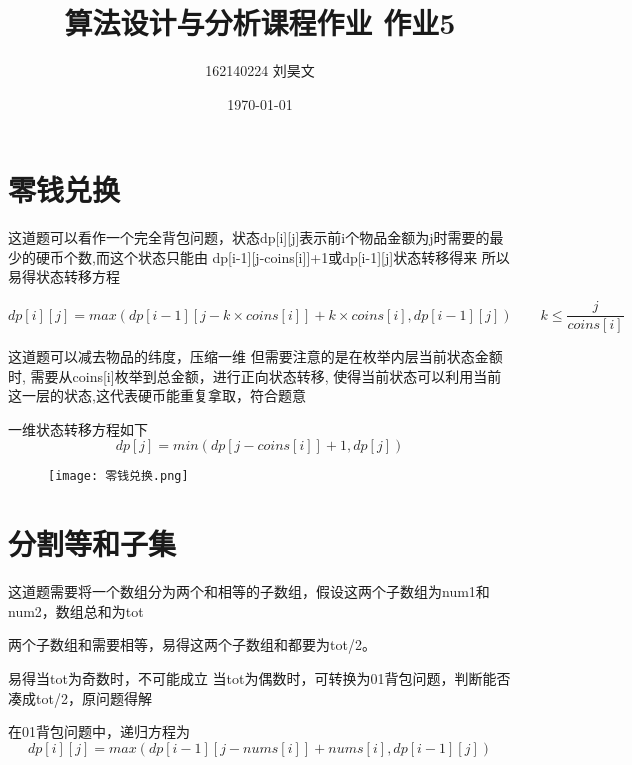 \documentclass{article}
\title{\textbf{算法设计与分析课程作业 作业5}}
\author{162140224 刘昊文}
\date{\today}
\begin{document}
\maketitle

\section{零钱兑换}
这道题可以看作一个完全背包问题，状态dp[i][j]表示前i个物品金额为j时需要的最少的硬币个数,而这个状态只能由
dp[i-1][j-coins[i]]+1或dp[i-1][j]状态转移得来
所以易得状态转移方程

\begin{equation}
    dp[i][j]=max(dp[i-1][j-k \times coins[i]]+k\times coins[i],dp[i-1][j])  \qquad k\leq \frac{j}{coins[i]}
    \nonumber
\end{equation}


这道题可以减去物品的纬度，压缩一维
但需要注意的是在枚举内层当前状态金额时,
需要从coins[i]枚举到总金额，进行正向状态转移,
使得当前状态可以利用当前这一层的状态,这代表硬币能重复拿取，符合题意

一维状态转移方程如下
\begin{equation}
    dp[j]=min(dp[j-coins[i]]+1,dp[j])
    \nonumber
\end{equation}


\begin{figure}[H]
    \begin{flushleft}
    \texttt{[image: 零钱兑换.png]}
    \end{flushleft}
\end{figure}


\newpage
\section{分割等和子集}
这道题需要将一个数组分为两个和相等的子数组，假设这两个子数组为num1和num2，数组总和为tot


两个子数组和需要相等，易得这两个子数组和都要为tot/2。

易得当tot为奇数时，不可能成立
当tot为偶数时，可转换为01背包问题，判断能否凑成tot/2，原问题得解


在01背包问题中，递归方程为
\begin{equation}
    dp[i][j]=max(dp[i-1][j-nums[i]]+nums[i],dp[i-1][j])
\nonumber
\end{equation}
\end{document}
